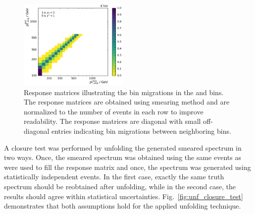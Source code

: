 \begin{figure}[htp]
    \includegraphics[width=0.47\textwidth]{figures/measurement/res_matrix_ptavg_normalized_yb2ys0.pdf}
    \caption[Response matrix used for the unfolding procedure]{Response matrices
        illustrating the bin migrations in the \ystar and \yboost bins. The
        response matrices are obtained using smearing method and are normalized
        to the number of events in each row to improve readability. The response
        matrices are diagonal with small off-diagonal entries indicating bin
    migrations between neighboring bins.}
    \label{fig:res_matrix}
\end{figure}

A closure test was performed by unfolding the generated smeared spectrum in two
ways. Once, the smeared spectrum was obtained using the same events as were used
to fill the response matrix and once, the spectrum was generated using
statistically independent events. In the first case, exactly the same truth spectrum should
be reobtained after unfolding, while in the second case, the results should
agree within statistical uncertainties. Fig.~\ref{fig:unf_closure_test} demonstrates that both
assumptions hold for the applied unfolding technique.

